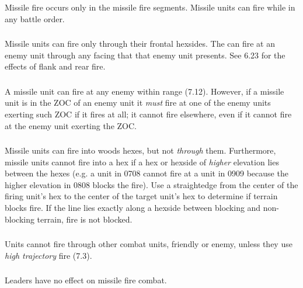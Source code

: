 \subsubsection[When Missiles Fire]{} Missile fire occurs only in the missile fire segments. Missile units can fire while in any battle order.

\subsubsection[Direction]{} Missile units can fire only through their frontal hexsides. The can fire at an enemy unit through any facing that that enemy unit presents. See 6.23 for the effects of flank and rear fire.

\subsubsection[ZOC Restrictions]{} A missile unit can fire at any enemy within range (7.12). However, if a missile unit is in the ZOC of an enemy unit it \textit{must} fire at one of the enemy units exerting such ZOC if it fires at all; it cannot fire elsewhere, even if it cannot fire at the enemy unit exerting the ZOC.

\subsubsection[Woods]{} Missile units can fire into woods hexes, but not \textit{through} them. Furthermore, missile units cannot fire into a hex if a hex or hexside of \textit{higher} elevation lies between the hexes (e.g. a unit in 0708 cannot fire at a unit in 0909 because the higher elevation in 0808 blocks the fire). Use a straightedge from the center of the firing unit's hex to the center of the target unit's hex to determine if terrain blocks fire. If the line lies exactly along a hexside between blocking and non-blocking terrain, fire is not blocked.

\subsubsection[Firing Through Units]{} Units cannot fire through other combat units, friendly or enemy, unless they use \textit{high trajectory} fire (7.3).

\subsubsection[Leaders]{} Leaders have no effect on missile fire combat.

